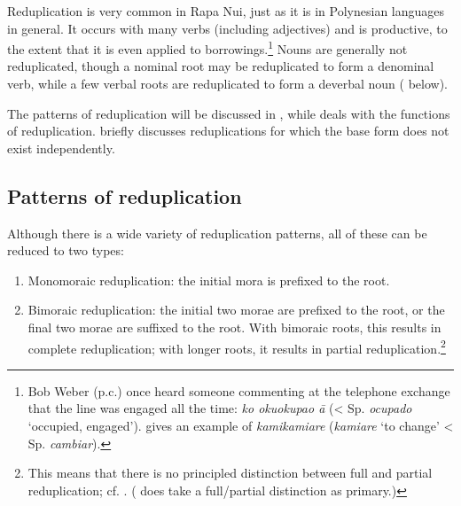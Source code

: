 Reduplication is very common in Rapa Nui, just as it is in Polynesian languages in general. It occurs with many verbs (including adjectives) and is productive, to the extent that it is even applied to borrowings.\footnote{\label{fn:70}Bob Weber (p.c.) once heard someone commenting at the telephone exchange that the line was engaged all the time: \textit{ko okuokupao {\ꞌ}ā} ({\textless} Sp. \textit{ocupado} ‘occupied, engaged’). \citet[198]{Makihara2001Adaptation} gives an example of \textit{kamikamiare} (\textit{kamiare} ‘to change’ {\textless} Sp. \textit{cambiar}).} Nouns are generally not reduplicated, though a nominal root may be reduplicated to form a denominal verb, while a few verbal roots are reduplicated to form a deverbal noun ( below). 

The patterns of reduplication will be discussed in , while  deals with the functions of reduplication.  briefly discusses reduplications for which the base form does not exist independently.

\subsection{Patterns of reduplication}\label{sec:2.6.1}
Although there is a wide variety of reduplication patterns, all of these can be reduced to two types:

\begin{enumerate}
\item 
Monomoraic reduplication: the initial mora is prefixed to the root.

\item 
Bimoraic reduplication: the initial two morae are prefixed to the root, or the final two morae are suffixed to the root. With bimoraic roots, this results in complete reduplication; with longer roots, it results in partial reduplication.\footnote{\label{fn:71}This means that there is no principled distinction between full and partial reduplication; cf. \citet[39]{Blust2001}. (\citealt{Davletshin2015} does take a full/partial distinction as primary.)} 

\end{enumerate}

